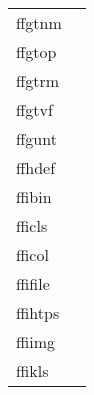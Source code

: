\documentclass[11pt]{book}
\begin{document}
\begin{tabular}{lr}
ffgtnm  & \pageref{ffgtnm} \\
ffgtop    & \pageref{ffgtop} \\
ffgtrm  & \pageref{ffgtrm} \\
ffgtvf  & \pageref{ffgtvf} \\
ffgunt     & \pageref{ffgunt} \\
ffhdef    & \pageref{ffhdef} \\
ffibin    & \pageref{ffibin} \\
fficls  & \pageref{fficls} \\
fficol   & \pageref{fficol} \\
ffifile  & \pageref{ffiurl} \\
ffihtps  & \pageref{ffihtps} \\
ffiimg     & \pageref{ffiimg} \\
ffikls    & \pageref{ffikyx} \\

\end{tabular}
\end{document}
